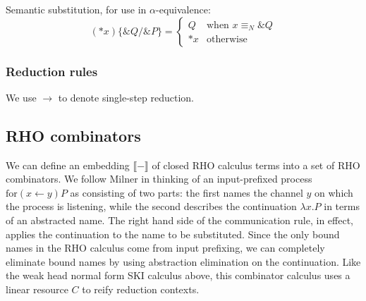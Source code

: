 \documentclass[a4paper,UKenglish]{lipics-v2016}
\newcommand{\for}{\mathrm{for }}
\newcommand{\interp}[1]{\llbracket #1 \rrbracket}
\newcommand{\from}{\leftarrow}
\begin{document}
Semantic substitution, for use in $\alpha$-equivalence:
\[ (*x)\{\&Q/\&P\} = \left\{\begin{array}{rl}
  Q & \mbox{when } x \equiv_N \&Q\\
  *x & \mbox{otherwise}
\end{array}\right. \]

\subsubsection{Reduction rules}
We use $\to$ to denote single-step reduction.
\begin{center}
\UIC{$x_0!Q \;|\; \for(y \from x_1)P \quad \to\quad P\{\&Q / y\}$} \DP \quad \quad
\end{center}

\begin{center}
 \DP
\end{center}

\begin{center}
  
 \DP
\end{center}
\subsection{RHO combinators}
We can define an embedding $\interp{-}$ of closed RHO calculus terms into a set of RHO combinators.  We follow Milner \cite{milner91polyadicpi} in thinking of an input-prefixed process $\for(x \from y)P$ as consisting of two parts: the first names the channel $y$ on which the process is listening, while the second describes the continuation $\lambda x.P$ in terms of an abstracted name.  The right hand side of the communication rule, in effect, applies the continuation to the name to be substituted.  Since the only bound names in the RHO calculus come from input prefixing, we can completely eliminate bound names by using abstraction elimination on the continuation.  Like the weak head normal form SKI calculus above, this combinator calculus uses a linear resource $C$ to reify reduction contexts.
\end{document}
